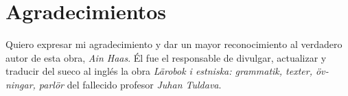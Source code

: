 

\chapter*{Agradecimientos} %

Quiero expresar mi agradecimiento y dar un mayor reconocimiento al verdadero autor de esta obra, \emph{Ain Haas}. Él fue el responsable de divulgar, actualizar y traducir del sueco al inglés la obra \foreignlanguage{swedish}{\emph{Lärobok i estniska: grammatik, texter, övningar, parlör}} del fallecido profesor \emph{Juhan Tuldava}. \\

